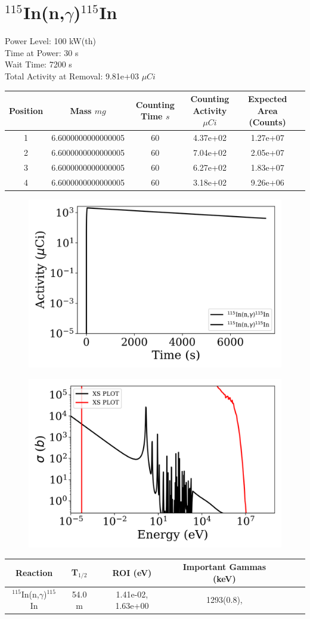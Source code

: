 \newpage

\section*{ $^{115}$In(n,$\gamma$)$^{115}$In }

Power Level: 100 kW(th) \\
Time at Power: 30 s \\
Wait Time: 7200 s \\
Total Activity at Removal: 9.81e+03 $\mu Ci$

\begin{table}[h]
\centering
\begin{tabular}{ |c|c|c|c|c|c| }
 \hline
 Position & Mass $mg$ & Counting Time $s$ & Counting Activity $\mu Ci$ & Expected Area (Counts) \\
 \hline 
 1 & 6.6000000000000005 & 60 & 4.37e+02 & 1.27e+07\\ 
\hline
 2 & 6.6000000000000005 & 60 & 7.04e+02 & 2.05e+07\\ 
\hline
 3 & 6.6000000000000005 & 60 & 6.27e+02 & 1.83e+07\\ 
\hline
 4 & 6.6000000000000005 & 60 & 3.18e+02 & 9.26e+06\\ 
\hline
\end{tabular}
\end{table}

\begin{figure}[!ht]
   \centering
   \includegraphics[width=.4\textwidth]{source/plot/In-115(n,gamma)In-116_wisconsin1.png} 

\end{figure}

\begin{figure}[!ht]
   \centering
   \includegraphics[width=.4\textwidth]{source/plot/In-115(n,gamma)In-116.png} 

\end{figure}

\begin{table}[h]
\centering
\begin{tabular}{ |c|c|c|c|c|c|c| }
 \hline
 Reaction & T$_{1/2}$ & ROI (eV) & Important Gammas (keV) \\
 \hline 
 $^{115}$In(n,$\gamma$)$^{115}$In & 54.0 m & 1.41e-02, 1.63e+00 & 1293(0.8),  \\ 
\hline
\end{tabular}
\end{table}
